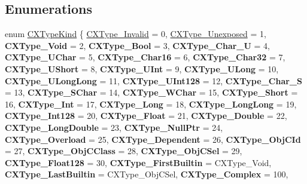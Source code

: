 \subsection*{Enumerations}
\begin{DoxyCompactItemize}
\item 
enum \mbox{\hyperlink{group__CINDEX__TYPES_gaad39de597b13a18882c21860f92b095a}{C\+X\+Type\+Kind}} \{ \newline
\mbox{\hyperlink{group__CINDEX__TYPES_ggaad39de597b13a18882c21860f92b095aa242df2c1db62d571da24b4692781416a}{C\+X\+Type\+\_\+\+Invalid}} = 0, 
\mbox{\hyperlink{group__CINDEX__TYPES_ggaad39de597b13a18882c21860f92b095aa1aac64a0419dc4447e3bd63176c6a7d8}{C\+X\+Type\+\_\+\+Unexposed}} = 1, 
{\bfseries C\+X\+Type\+\_\+\+Void} = 2, 
{\bfseries C\+X\+Type\+\_\+\+Bool} = 3, 
\newline
{\bfseries C\+X\+Type\+\_\+\+Char\+\_\+U} = 4, 
{\bfseries C\+X\+Type\+\_\+\+U\+Char} = 5, 
{\bfseries C\+X\+Type\+\_\+\+Char16} = 6, 
{\bfseries C\+X\+Type\+\_\+\+Char32} = 7, 
\newline
{\bfseries C\+X\+Type\+\_\+\+U\+Short} = 8, 
{\bfseries C\+X\+Type\+\_\+\+U\+Int} = 9, 
{\bfseries C\+X\+Type\+\_\+\+U\+Long} = 10, 
{\bfseries C\+X\+Type\+\_\+\+U\+Long\+Long} = 11, 
\newline
{\bfseries C\+X\+Type\+\_\+\+U\+Int128} = 12, 
{\bfseries C\+X\+Type\+\_\+\+Char\+\_\+S} = 13, 
{\bfseries C\+X\+Type\+\_\+\+S\+Char} = 14, 
{\bfseries C\+X\+Type\+\_\+\+W\+Char} = 15, 
\newline
{\bfseries C\+X\+Type\+\_\+\+Short} = 16, 
{\bfseries C\+X\+Type\+\_\+\+Int} = 17, 
{\bfseries C\+X\+Type\+\_\+\+Long} = 18, 
{\bfseries C\+X\+Type\+\_\+\+Long\+Long} = 19, 
\newline
{\bfseries C\+X\+Type\+\_\+\+Int128} = 20, 
{\bfseries C\+X\+Type\+\_\+\+Float} = 21, 
{\bfseries C\+X\+Type\+\_\+\+Double} = 22, 
{\bfseries C\+X\+Type\+\_\+\+Long\+Double} = 23, 
\newline
{\bfseries C\+X\+Type\+\_\+\+Null\+Ptr} = 24, 
{\bfseries C\+X\+Type\+\_\+\+Overload} = 25, 
{\bfseries C\+X\+Type\+\_\+\+Dependent} = 26, 
{\bfseries C\+X\+Type\+\_\+\+Obj\+C\+Id} = 27, 
\newline
{\bfseries C\+X\+Type\+\_\+\+Obj\+C\+Class} = 28, 
{\bfseries C\+X\+Type\+\_\+\+Obj\+C\+Sel} = 29, 
{\bfseries C\+X\+Type\+\_\+\+Float128} = 30, 
{\bfseries C\+X\+Type\+\_\+\+First\+Builtin} = C\+X\+Type\+\_\+\+Void, 
\newline
{\bfseries C\+X\+Type\+\_\+\+Last\+Builtin} = C\+X\+Type\+\_\+\+Obj\+C\+Sel, 
{\bfseries C\+X\+Type\+\_\+\+Complex} = 100, 

\end{DoxyCompactItemize}
